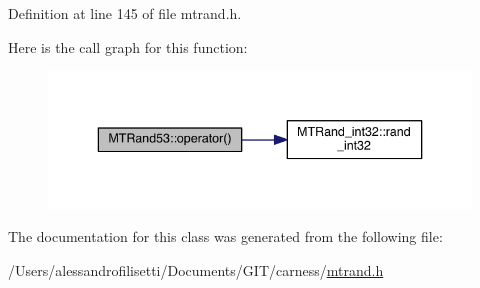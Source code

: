 Definition at line 145 of file mtrand.\-h.



Here is the call graph for this function\-:\nopagebreak
\begin{figure}[H]
\begin{center}
\leavevmode
\includegraphics[width=340pt]{a00017_ab6657cb5349f39bc4553d3a970458b45_cgraph}
\end{center}
\end{figure}




The documentation for this class was generated from the following file\-:\begin{DoxyCompactItemize}
\item 
/\-Users/alessandrofilisetti/\-Documents/\-G\-I\-T/carness/\hyperlink{a00091}{mtrand.\-h}\end{DoxyCompactItemize}
